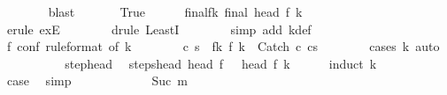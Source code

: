 \begin{isabellebody}
\ \ \ \ \ \ \isamarkupfalse%
\ blast\ \isanewline
\ \ \ \ \isamarkupfalse%
\ True\isanewline
\ \ \ \ \isamarkupfalse%
\ final{\isacharunderscore}f{\isacharunderscore}k{\isacharcolon}\ {\isachardoublequoteopen}final\ {\isacharparenleft}head\ {\isacharparenleft}f\ k{\isacharparenright}{\isacharparenright}{\isachardoublequoteclose}\isanewline
\ \ \ \ \ \ \isamarkupfalse%
\ {\isacharminus}\isanewline
\ \ \ \ \ \ \isamarkupfalse%
\ {\isacharparenleft}erule\ exE{\isacharparenright}\isanewline
\ \ \ \ \ \ \isamarkupfalse%
\ {\isacharparenleft}drule\ LeastI{\isacharparenright}\isanewline
\ \ \ \ \ \ \isamarkupfalse%
\ {\isacharparenleft}simp\ add{\isacharcolon}\ k{\isacharunderscore}def{\isacharparenright}\isanewline
\ \ \ \ \ \ \isamarkupfalse%
\isanewline
\ \ \ \ \isamarkupfalse%
\isanewline
\ \ \ \ \isamarkupfalse%
\ f{\isacharunderscore}{}\ conf\ {\isacharbrackleft}rule{\isacharunderscore}format{\isacharcomma}\ of\ {\isachardoublequoteopen}k\ {\isacharminus}\ {}{\isachardoublequoteclose}{\isacharbrackright}\isanewline
\ \ \ \ \isamarkupfalse%
\ c{\isacharprime}\ s{\isacharprime}\ \ f{\isacharunderscore}k{\isacharcolon}\ {\isachardoublequoteopen}f\ k\ {\isacharequal}\ {\isacharparenleft}Catch\ c{\isacharprime}\ cs{\isacharprime}{\isacharparenright}{\isachardoublequoteclose}\isanewline
\ \ \ \ \ \ \isamarkupfalse%
\ {\isacharparenleft}cases\ k{\isacharparenright}\ auto\isanewline
\ \ \ \ \isamarkupfalse%
\isanewline
\ \ \ \ \isamarkupfalse%
\ step{\isacharunderscore}head\ \isamarkupfalse%
\ steps{\isacharunderscore}head{\isacharcolon}\ {\isachardoublequoteopen}{\isasymGamma}{\isasymturnstile}head\ {\isacharparenleft}f\ {}{\isacharparenright}\ {\isasymrightarrow}\isactrlsup {\isacharasterisk}\ head\ {\isacharparenleft}f\ k{\isacharparenright}{\isachardoublequoteclose}\isanewline
\ \ \ \ \isamarkupfalse%
\ {\isacharparenleft}induct\ k{\isacharparenright}\isanewline
\ \ \ \ \ \ \isamarkupfalse%
\ {}\ \isamarkupfalse%
\ {\isacharquery}case\ \isamarkupfalse%
\ simp\isanewline
\ \ \ \ \isamarkupfalse%
\isanewline
\ \ \ \ \ \ \isamarkupfalse%
\ {\isacharparenleft}Suc\ m{\isacharparenright}\isanewline
\ \ \ \ \ \ \isamarkupfalse%

\end{isabellebody}
